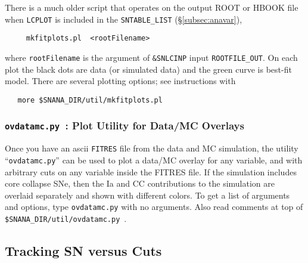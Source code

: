 \documentclass[12pt]{article}
\newcommand{\snanadir}{{\tt SNANA\_DIR}}
\begin{document}
There is a much older script that operates on the output ROOT or HBOOK
file when {\tt LCPLOT} is included in the {\tt SNTABLE\_LIST}
(\S\ref{subsec:anavar}),
%
\begin{verbatim}
     mkfitplots.pl  <rootFilename>
\end{verbatim}
%
where {\tt rootFilename} is the argument of {\tt \&SNLCINP}
input {\tt ROOTFILE\_OUT}.
On each plot the black dots are data (or simulated data)
and the green curve is best-fit model.
There are several plotting options; see instructions with
\begin{verbatim}
   more $SNANA_DIR/util/mkfitplots.pl
\end{verbatim}

  \subsubsection{{\tt ovdatamc.py}~: Plot Utility for Data/MC Overlays}
  \label{sss:ovdatamc}

Once you have an ascii {\tt FITRES} file from the data and
MC simulation, the utility ``{\tt ovdatamc.py}'' can be used
to plot a data/MC overlay for any variable, and with arbitrary
cuts on any variable inside the FITRES file. If the simulation
includes core collapse SNe, then the Ia and CC contributions
to the simulation are overlaid separately and shown with
different colors. To get a list of arguments and options,
type {\tt ovdatamc.py} with no arguments. Also read comments
at top of {\tt \$\snanadir/util/ovdatamc.py}~.



   \subsection{Tracking SN versus Cuts}
   \label{subsec:sncuts}
\end{document}
